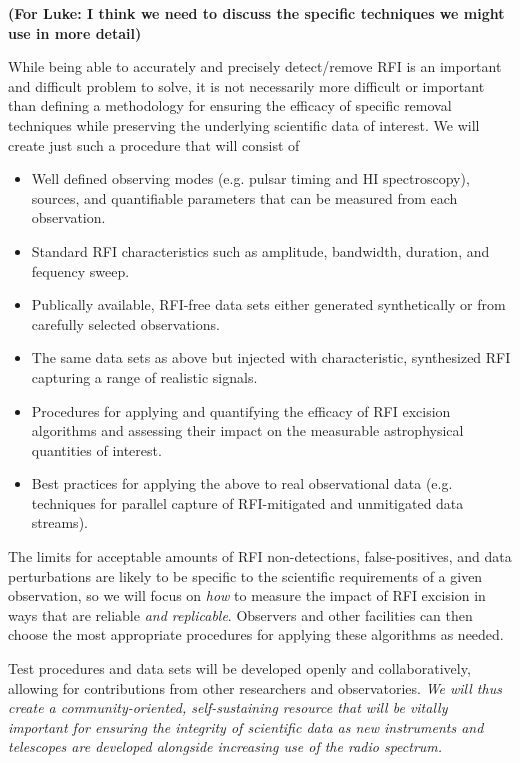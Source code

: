 \documentclass[10pt]{myNSF}
\begin{document}
\textbf{(For Luke: I think we need to discuss the specific techniques
  we might use in more detail)}

While being able to accurately and precisely detect/remove RFI is an
important and difficult problem to solve, it is not necessarily more
difficult or important than defining a methodology for ensuring the
efficacy of specific removal techniques while preserving the
underlying scientific data of interest.  We will create just such a
procedure that will consist of
\begin{itemize}
\item{Well defined observing modes (e.g. pulsar timing and H{\sc I}
    spectroscopy), sources, and quantifiable parameters that can be
    measured from each observation.}
\item{Standard RFI characteristics such as amplitude, bandwidth,
    duration, and fequency sweep.}
\item{Publically available, RFI-free data sets either generated
    synthetically or from carefully selected observations.}
\item{The same data sets as above but injected with characteristic,
    synthesized RFI capturing a range of realistic signals.}
\item{Procedures for applying and quantifying the efficacy of RFI
    excision algorithms and assessing their impact on the measurable
    astrophysical quantities of interest.}
\item{Best practices for applying the above to real observational data
    (e.g. techniques for parallel capture of RFI-mitigated and
    unmitigated data streams).}
\end{itemize}

The limits for acceptable amounts of RFI non-detections,
false-positives, and data perturbations are likely to be specific to
the scientific requirements of a given observation, so we will focus
on \emph{how} to measure the impact of RFI excision in ways that are
reliable \emph{and replicable}.  Observers and other facilities can
then choose the most appropriate procedures for applying these
algorithms as needed.

Test procedures and data sets will be developed openly and
collaboratively, allowing for contributions from other researchers and
observatories.  \emph{We will thus create a community-oriented,
  self-sustaining resource that will be vitally important for ensuring
  the integrity of scientific data as new instruments and telescopes
  are developed alongside increasing use of the radio spectrum.}
\end{document}
